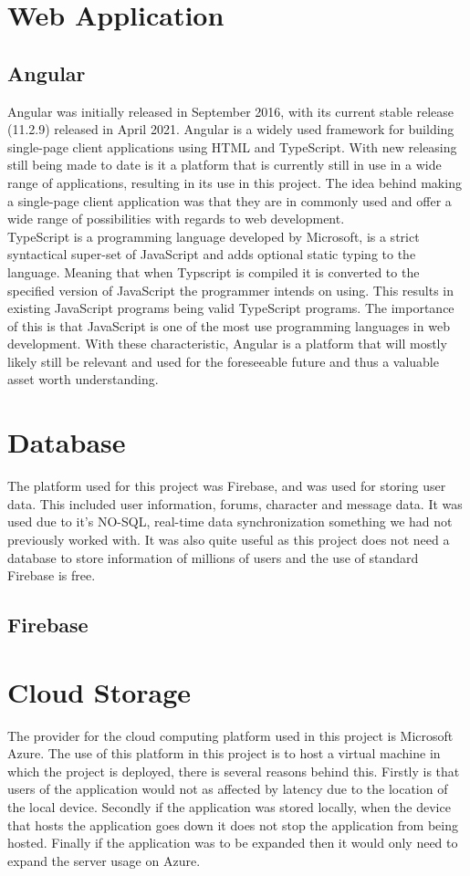 \section{Web Application}
\subsection{Angular}
Angular was initially released in September 2016, with its current stable release (11.2.9) released in April 2021.  Angular is a widely used framework for building single-page client applications using HTML and TypeScript.  With new releasing still being made to date is it a platform that is currently still in use in a wide range of applications, resulting in its use in this project.  The idea behind making a single-page client application was that they are in commonly used and offer a wide range of possibilities with regards to web development. \\

TypeScript is a programming language developed by Microsoft, is a strict syntactical super-set of JavaScript and adds optional static typing to the language.  Meaning that when Typscript is compiled it is converted to the specified version of JavaScript the programmer intends on using.  This results in existing JavaScript programs being valid TypeScript programs.  The importance of this is that JavaScript is one of the most use programming languages in web development.  With these characteristic, Angular is a platform that will mostly likely still be relevant and used for the foreseeable future and thus a valuable asset worth understanding.

\section{Database}
The platform used for this project was Firebase, and was used for storing user data.  This included user information, forums, character and message data.  It was used due to it's NO-SQL, real-time data synchronization something we had not previously worked with.  It was also quite useful as this project does not need a database to store information of millions of users and the use of standard Firebase is free.

\subsection{Firebase}

\section{Cloud Storage}
The provider for the cloud computing platform used in this project is Microsoft Azure.  The use of this platform in this project is to host a virtual machine in which the project is deployed, there is several reasons behind this. Firstly is that users of the application would not as affected by latency due to the location of the local device.  Secondly if the application was stored locally, when the device that hosts the application goes down it does not stop the application from being hosted.  Finally if the application was to be expanded then it would only need to expand the server usage on Azure.

